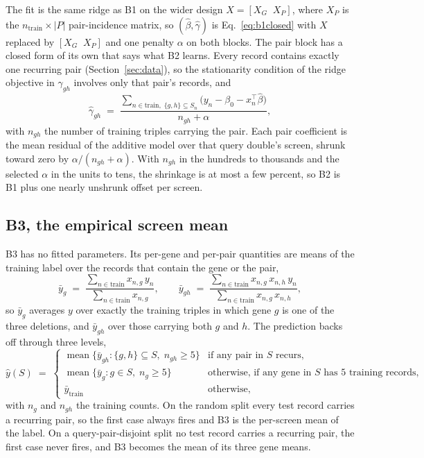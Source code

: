 The fit is the same ridge as B1 on the wider design $X = [X_G \;\; X_P]$, where
$X_P$ is the $n_{\mathrm{train}} \times |P|$ pair-incidence matrix, so
$(\hat{\beta}, \hat{\gamma})$ is Eq.~\ref{eq:b1closed} with $X$ replaced by
$[X_G \;\; X_P]$ and one penalty $\alpha$ on both blocks. The pair block has a closed
form of its own that says what B2 learns. Every record contains exactly one
recurring pair (Section~\ref{sec:data}), so the stationarity condition of the ridge
objective in $\gamma_{gh}$ involves only that pair's records, and
%
\begin{equation}
  \hat{\gamma}_{gh} \;=\; \frac{\sum_{n \in \mathrm{train},\; \{g,h\} \subseteq S_n}
  \bigl(y_n - \beta_0 - x_n^{\top}\hat{\beta}\bigr)}{n_{gh} + \alpha} ,
  \label{eq:b2gamma}
\end{equation}
%
with $n_{gh}$ the number of training triples carrying the pair. Each pair
coefficient is the mean residual of the additive model over that query double's
screen, shrunk toward zero by $\alpha / (n_{gh} + \alpha)$. With $n_{gh}$ in the
hundreds to thousands and the selected $\alpha$ in the units to tens, the shrinkage
is at most a few percent, so B2 is B1 plus one nearly unshrunk offset per screen.

\subsection{B3, the empirical screen mean}
\label{sec:b3}

B3 has no fitted parameters. Its per-gene and per-pair quantities are means of the
training label over the records that contain the gene or the pair,
%
\begin{equation}
  \bar{y}_g \;=\; \frac{\sum_{n \in \mathrm{train}} x_{n,g}\, y_n}{\sum_{n \in \mathrm{train}} x_{n,g}},
  \qquad
  \bar{y}_{gh} \;=\; \frac{\sum_{n \in \mathrm{train}} x_{n,g}\, x_{n,h}\, y_n}{\sum_{n \in \mathrm{train}} x_{n,g}\, x_{n,h}} ,
  \label{eq:b3means}
\end{equation}
%
so $\bar{y}_g$ averages $y$ over exactly the training triples in which gene $g$ is
one of the three deletions, and $\bar{y}_{gh}$ over those carrying both $g$ and
$h$. The prediction backs off through three levels,
%
\begin{equation}
  \hat{y}(S) \;=\;
  \begin{cases}
    \operatorname{mean}\{\bar{y}_{gh} : \{g,h\} \subseteq S,\; n_{gh} \ge 5\}
      & \text{if any pair in } S \text{ recurs,} \\
    \operatorname{mean}\{\bar{y}_{g} : g \in S,\; n_g \ge 5\}
      & \text{otherwise, if any gene in } S \text{ has 5 training records,} \\
    \bar{y}_{\mathrm{train}} & \text{otherwise,}
  \end{cases}
  \label{eq:b3}
\end{equation}
%
with $n_g$ and $n_{gh}$ the training counts. On the random split every test record
carries a recurring pair, so the first case always fires and B3 is the per-screen
mean of the label. On a query-pair-disjoint split no test record carries a
recurring pair, the first case never fires, and B3 becomes the mean of its three
gene means.

